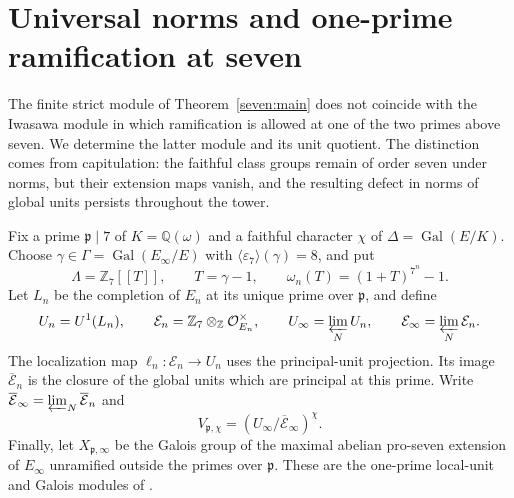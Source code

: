 \section{Universal norms and one-prime ramification at seven}
\label{seven:universal-norms}

The finite strict module of Theorem~\ref{seven:main} does not coincide
with the Iwasawa module in which ramification is allowed at one of the
two primes above seven. We determine the latter module and its unit
quotient. The distinction comes from capitulation: the faithful class
groups remain of order seven under norms, but their extension maps
vanish, and the resulting defect in norms of global units persists
throughout the tower.

Fix a prime $\mathfrak p\mid7$ of $K=\mathbb Q(\omega)$ and a faithful
character $\chi$ of $\Delta=\operatorname{Gal}(E/K)$. Choose
$\gamma\in\Gamma=\operatorname{Gal}(E_\infty/E)$ with
$\langle\varepsilon_7\rangle(\gamma)=8$, and put
\[
 \Lambda=\mathbb Z_7[[T]],\qquad T=\gamma-1,\qquad
 \omega_n(T)=(1+T)^{7^n}-1.
\]
Let $L_n$ be the completion of $E_n$ at its unique prime over
$\mathfrak p$, and define
\[
 U_n=U^1(L_n),\qquad
 \mathcal E_n=\mathbb Z_7\otimes_{\mathbb Z}\mathcal O_{E_n}^{\times},
 \qquad
 U_\infty=\varprojlim_N U_n,\qquad
 \mathcal E_\infty=\varprojlim_N\mathcal E_n.
\]
The localization map $\ell_n:\mathcal E_n\to U_n$ uses the principal-unit
projection. Its image $\overline{\mathcal E}_n$ is the closure of the
global units which are principal at this prime. Write
$\overline{\mathcal E}_\infty=\varprojlim_N\overline{\mathcal E}_n$ and
\[
 V_{\mathfrak p,\chi}
   =(U_\infty/\overline{\mathcal E}_\infty)^\chi.
\]
Finally, let $X_{\mathfrak p,\infty}$ be the Galois group of the maximal
abelian pro-seven extension of $E_\infty$ unramified outside the primes
over $\mathfrak p$. These are the one-prime local-unit and Galois modules
of \cite[printed p.~36]{Rubin}.

